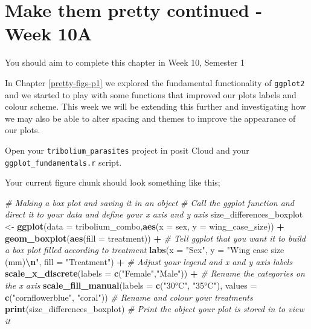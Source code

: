 \documentclass[
]{book}
\newenvironment{Shaded}{\begin{snugshade}}{\end{snugshade}}
\newcommand{\AttributeTok}[1]{\textcolor[rgb]{0.13,0.29,0.53}{#1}}
\newcommand{\CommentTok}[1]{\textcolor[rgb]{0.56,0.35,0.01}{\textit{#1}}}
\newcommand{\FunctionTok}[1]{\textcolor[rgb]{0.13,0.29,0.53}{\textbf{#1}}}
\newcommand{\NormalTok}[1]{#1}
\newcommand{\OtherTok}[1]{\textcolor[rgb]{0.56,0.35,0.01}{#1}}
\newcommand{\SpecialCharTok}[1]{\textcolor[rgb]{0.81,0.36,0.00}{\textbf{#1}}}
\newcommand{\StringTok}[1]{\textcolor[rgb]{0.31,0.60,0.02}{#1}}
\begin{document}
\hypertarget{pretty-figs-p2}{%
\chapter{Make them pretty continued - Week 10A}\label{pretty-figs-p2}}

You should aim to complete this chapter in Week 10, Semester 1

In Chapter \ref{pretty-figs-p1} we explored the fundamental functionality of \texttt{ggplot2} and we started to play with some functions that improved our plots labels and colour scheme. This week we will be extending this further and investigating how we may also be able to alter spacing and themes to improve the appearance of our plots.

Open your \texttt{tribolium\_parasites} project in posit Cloud and your \texttt{ggplot\_fundamentals.r} script.

Your current figure chunk should look something like this;

\begin{Shaded}
\begin{Highlighting}[]
\CommentTok{\# Making a box plot and saving it in an object}
\CommentTok{\# Call the ggplot function and direct it to your data and define your x axis and y axis}
\NormalTok{size\_differences\_boxplot }\OtherTok{\textless{}{-}} \FunctionTok{ggplot}\NormalTok{(}\AttributeTok{data =}\NormalTok{ tribolium\_combo,}\FunctionTok{aes}\NormalTok{(}\AttributeTok{x =}\NormalTok{ sex, }\AttributeTok{y =}\NormalTok{ wing\_case\_size)) }\SpecialCharTok{+} 
  \FunctionTok{geom\_boxplot}\NormalTok{(}\FunctionTok{aes}\NormalTok{(}\AttributeTok{fill =}\NormalTok{ treatment)) }\SpecialCharTok{+} \CommentTok{\# Tell ggplot that you want it to build a box plot filled according to treatment}
  \FunctionTok{labs}\NormalTok{(}\AttributeTok{x =} \StringTok{"Sex"}\NormalTok{, }\AttributeTok{y =} \StringTok{"Wing case size (mm)}\SpecialCharTok{\textbackslash{}n}\StringTok{"}\NormalTok{, }\AttributeTok{fill =} \StringTok{"Treatment"}\NormalTok{) }\SpecialCharTok{+} \CommentTok{\# Adjust your legend and x and y axis labels }
  \FunctionTok{scale\_x\_discrete}\NormalTok{(}\AttributeTok{labels =} \FunctionTok{c}\NormalTok{(}\StringTok{"Female"}\NormalTok{,}\StringTok{"Male"}\NormalTok{)) }\SpecialCharTok{+} \CommentTok{\# Rename the categories on the x axis }
  \FunctionTok{scale\_fill\_manual}\NormalTok{(}\AttributeTok{labels =} \FunctionTok{c}\NormalTok{(}\StringTok{"30°C"}\NormalTok{, }\StringTok{"35°C"}\NormalTok{), }\AttributeTok{values =} \FunctionTok{c}\NormalTok{(}\StringTok{"cornflowerblue"}\NormalTok{, }\StringTok{"coral"}\NormalTok{)) }\CommentTok{\# Rename and colour your treatments}
\FunctionTok{print}\NormalTok{(size\_differences\_boxplot) }\CommentTok{\# Print the object your plot is stored in to view it}
\end{Highlighting}
\end{Shaded}
\end{document}
